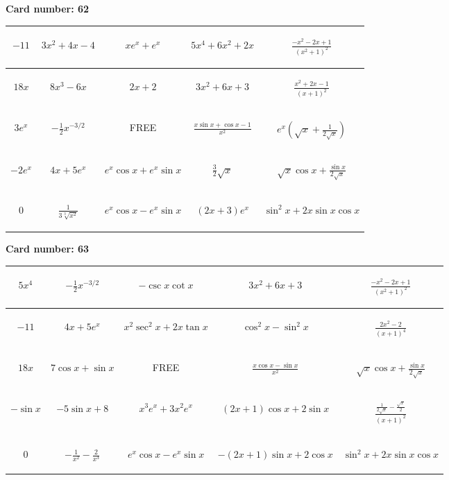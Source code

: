 \documentclass{article}
\newcommand{\entry}[1]{\begin{minipage}[t][2.75cm][t]{4cm} \vspace{1cm} \begin{center}#1\end{center} \end{minipage}}
\newcommand{\freespace}{\entry{FREE}}
\newcommand{\cardnumber}[1]{\noindent \textbf{Card number: #1} \bigskip}
\begin{document}
\pagebreak

\cardnumber{62}
\begin{center}
\begin{tabular}{|*{5}{c|}}
    \hline
    \entry{$-11$} & \entry{$3x^2 + 4x - 4$} & \entry{$x e^x + e^x$} & \entry{$5x^4 + 6x^2 + 2x$} & \entry{$\frac{-x^2 - 2x + 1}{(x^2 + 1)^2}$} \\ \hline
    \entry{$18x$} & \entry{$8x^3 - 6x$} & \entry{$2x + 2$} & \entry{$3x^2 + 6x + 3$} & \entry{$\frac{x^2 + 2x - 1}{(x + 1)^2}$} \\ \hline
    \entry{$3e^x$} & \entry{$-\frac{1}{2} x^{-3/2}$} & \freespace & \entry{$\frac{x \sin x + \cos x - 1}{x^2}$} & \entry{$e^x \left(\sqrt{x} + \frac{1}{2\sqrt{x}}\right)$} \\ \hline
    \entry{$-2e^x$} & \entry{$4x + 5e^x$} & \entry{$e^x \cos x + e^x \sin x$} & \entry{$\frac{3}{2} \sqrt{x}$} & \entry{$\sqrt{x} \cos x + \frac{\sin x}{2 \sqrt{x}}$} \\ \hline
    \entry{$0$} & \entry{$\frac{1}{3\sqrt[3]{x^2}}$} & \entry{$e^x \cos x - e^x \sin x$} & \entry{$(2x + 3) e^x$} & \entry{$\sin^2 x + 2x \sin x \cos x$} \\ \hline
\end{tabular}
\end{center}

\pagebreak

\cardnumber{63}
\begin{center}
\begin{tabular}{|*{5}{c|}}
    \hline
    \entry{$5x^4$} & \entry{$-\frac{1}{2} x^{-3/2}$} & \entry{$-\csc x \cot x$} & \entry{$3x^2 + 6x + 3$} & \entry{$\frac{-x^2 - 2x + 1}{(x^2 + 1)^2}$} \\ \hline
    \entry{$-11$} & \entry{$4x + 5e^x$} & \entry{$x^2 \sec^2 x + 2x \tan x$} & \entry{$\cos^2 x - \sin^2 x$} & \entry{$\frac{2x^2 - 2}{(x + 1)^4}$} \\ \hline
    \entry{$18x$} & \entry{$7 \cos x + \sin x$} & \freespace & \entry{$\frac{x \cos x - \sin x}{x^2}$} & \entry{$\sqrt{x} \cos x + \frac{\sin x}{2 \sqrt{x}}$} \\ \hline
    \entry{$-\sin x$} & \entry{$-5 \sin x + 8$} & \entry{$x^3 e^x + 3x^2 e^x$} & \entry{$(2x + 1) \cos x + 2 \sin x$} & \entry{$\frac{\frac{1}{2 \sqrt{x}} - \frac{\sqrt{x}}{2}}{(x + 1)^2}$} \\ \hline
    \entry{$0$} & \entry{$-\frac{1}{x^2} - \frac{2}{x^3}$} & \entry{$e^x \cos x - e^x \sin x$} & \entry{$-(2x + 1) \sin x + 2 \cos x$} & \entry{$\sin^2 x + 2x \sin x \cos x$} \\ \hline
\end{tabular}
\end{center}
\end{document}
